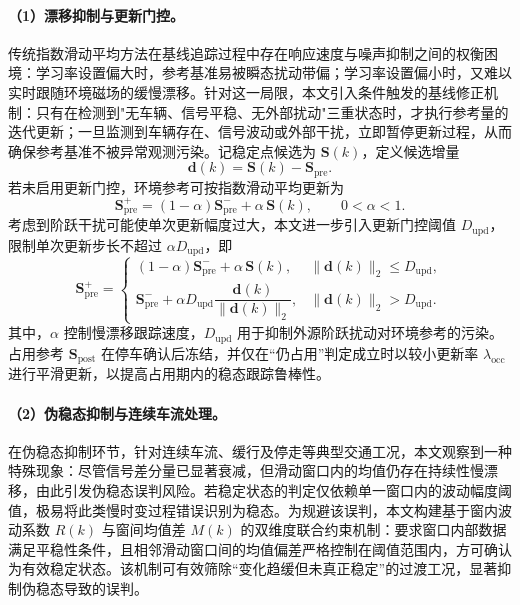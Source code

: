 \documentclass{xdupgthesis}
\begin{document}
\paragraph{（1）漂移抑制与更新门控。} 传统指数滑动平均方法在基线追踪过程中存在响应速度与噪声抑制之间的权衡困境：学习率设置偏大时，参考基准易被瞬态扰动带偏；学习率设置偏小时，又难以实时跟随环境磁场的缓慢漂移。针对这一局限，本文引入条件触发的基线修正机制：只有在检测到"无车辆、信号平稳、无外部扰动"三重状态时，才执行参考量的迭代更新；一旦监测到车辆存在、信号波动或外部干扰，立即暂停更新过程，从而确保参考基准不被异常观测污染。记稳定点候选为 $\mathbf{S}(k)$，定义候选增量
\begin{equation}
    \mathbf{d}(k)=\mathbf{S}(k)-\mathbf{S}_{\mathrm{pre}}.
\end{equation}
若未启用更新门控，环境参考可按指数滑动平均更新为
\begin{equation}
    \mathbf{S}_{\mathrm{pre}}^{+}=(1-\alpha)\mathbf{S}_{\mathrm{pre}}^{-}+\alpha\,\mathbf{S}(k),\qquad 0<\alpha<1.
\end{equation}
考虑到阶跃干扰可能使单次更新幅度过大，本文进一步引入更新门控阈值 $D_{\mathrm{upd}}$，限制单次更新步长不超过 $\alpha D_{\mathrm{upd}}$，即
\begin{equation}
    \mathbf{S}_{\mathrm{pre}}^{+}=
    \begin{cases}
        (1-\alpha)\mathbf{S}_{\mathrm{pre}}^{-}+\alpha\,\mathbf{S}(k), & \lVert\mathbf{d}(k)\rVert_2\le D_{\mathrm{upd}},\\
        \mathbf{S}_{\mathrm{pre}}^{-}+\alpha D_{\mathrm{upd}}\dfrac{\mathbf{d}(k)}{\lVert\mathbf{d}(k)\rVert_2}, & \lVert\mathbf{d}(k)\rVert_2>D_{\mathrm{upd}}.
    \end{cases}
\end{equation}
其中，$\alpha$ 控制慢漂移跟踪速度，$D_{\mathrm{upd}}$ 用于抑制外源阶跃扰动对环境参考的污染。占用参考 $\mathbf{S}_{\mathrm{post}}$ 在停车确认后冻结，并仅在“仍占用”判定成立时以较小更新率 $\lambda_{\mathrm{occ}}$ 进行平滑更新，以提高占用期内的稳态跟踪鲁棒性。

\paragraph{（2）伪稳态抑制与连续车流处理。}
在伪稳态抑制环节，针对连续车流、缓行及停走等典型交通工况，本文观察到一种特殊现象：尽管信号差分量已显著衰减，但滑动窗口内的均值仍存在持续性慢漂移，由此引发伪稳态误判风险。若稳定状态的判定仅依赖单一窗口内的波动幅度阈值，极易将此类慢时变过程错误识别为稳态。为规避该误判，本文构建基于窗内波动系数 $R(k)$ 与窗间均值差 $M(k)$ 的双维度联合约束机制：要求窗口内部数据满足平稳性条件，且相邻滑动窗口间的均值偏差严格控制在阈值范围内，方可确认为有效稳定状态。该机制可有效筛除“变化趋缓但未真正稳定”的过渡工况，显著抑制伪稳态导致的误判。
\end{document}
